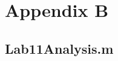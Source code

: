 \chapter{Appendix B} \label{cp:scripts}

\section{Lab11Analysis.m} \label{sec:analysis_script}

\inputminted{matlab}{Code/Lab11Analysis.m} \label{listing:analysis_script}